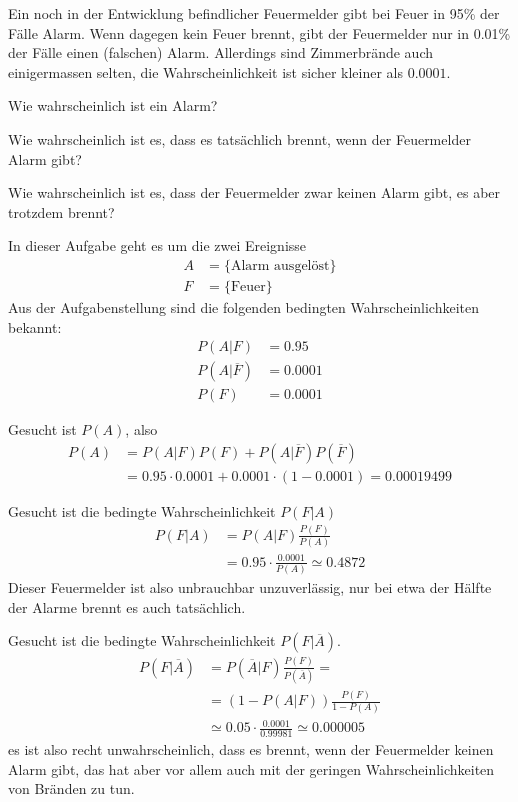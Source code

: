 Ein noch in der Entwicklung befindlicher Feuermelder gibt bei Feuer in 95\%
der Fälle Alarm. Wenn dagegen kein Feuer brennt, gibt der Feuermelder
nur in 0.01\% der Fälle einen (falschen) Alarm. Allerdings sind
Zimmerbrände auch einigermassen selten, die Wahrscheinlichkeit
ist sicher kleiner als $0.0001$.

\begin{teilaufgaben}
\item Wie wahrscheinlich ist ein Alarm?
\item Wie wahrscheinlich ist es, dass es tatsächlich brennt, wenn
der Feuermelder Alarm gibt?
\item Wie wahrscheinlich ist es, dass der Feuermelder zwar keinen
Alarm gibt, es aber trotzdem brennt?
\end{teilaufgaben}


\begin{loesung}
In dieser Aufgabe geht es um die zwei Ereignisse
\begin{align*}
A&=\{\text{Alarm ausgelöst}\}
\\
F&=\{\text{Feuer}\}
\end{align*}
Aus der Aufgabenstellung sind die folgenden bedingten Wahrscheinlichkeiten
bekannt:
\begin{align*}
P(A|F)&=0.95
\\
P(A|\overline F)&=0.0001
\\
P(F)&=0.0001
\end{align*}
\begin{teilaufgaben}
\item Gesucht ist $P(A)$, also
\begin{align*}
P(A)&=P(A|F)P(F)+P(A|\overline F)P(\overline F)
\\
&=0.95\cdot 0.0001+0.0001\cdot(1-0.0001)= 0.00019499
\end{align*}
\item
Gesucht ist die bedingte Wahrscheinlichkeit $P(F|A)$
\begin{align*}
P(F|A)
&=
P(A|F) \frac{P(F)}{P(A)}
\\
&=0.95\cdot\frac{0.0001}{P(A)}\simeq0.4872
\end{align*}
Dieser Feuermelder ist also unbrauchbar unzuverlässig, nur bei etwa der
Hälfte der Alarme brennt es auch tatsächlich.
\item Gesucht ist die bedingte Wahrscheinlichkeit $P(F|\overline A)$.
\begin{align*}
P(F|\overline A)
&=
P(\overline A|F)\frac{P(F)}{P(\overline A)}=
\\
&=
(1-P(A|F))\frac{P(F)}{1-P(A)}
\\
&\simeq
0.05\cdot \frac{0.0001}{0.99981}
\simeq
0.000005
\end{align*}
es ist also recht unwahrscheinlich, dass es brennt,
wenn der Feuermelder keinen Alarm gibt, das hat aber vor allem auch
mit der geringen Wahrscheinlichkeiten von Bränden zu tun.
\qedhere
\end{teilaufgaben}
\end{loesung}


